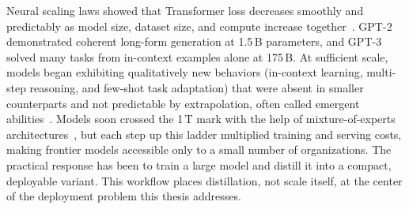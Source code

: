 \begin{foldable}
  Neural scaling laws showed that Transformer loss decreases smoothly and predictably as model size, dataset size, and compute increase together~\cite{kaplan2020scaling}.
  GPT-2~\cite{radford2019language} demonstrated coherent long-form generation at 1.5\,B parameters, and GPT-3~\cite{brown2020language} solved many tasks from in-context examples alone at 175\,B.
  At sufficient scale, models began exhibiting qualitatively new behaviors (in-context learning, multi-step reasoning, and few-shot task adaptation) that were absent in smaller counterparts and not predictable by extrapolation, often called emergent abilities~\cite{wei2022emergent}.
  Models soon crossed the 1\,T mark with the help of mixture-of-experts architectures~\cite{fedus2022switch}, but each step up this ladder multiplied training and serving costs, making frontier models accessible only to a small number of organizations.
  The practical response has been to train a large model and distill it into a compact, deployable variant.
  This workflow places distillation, not scale itself, at the center of the deployment problem this thesis addresses.
\end{foldable}
